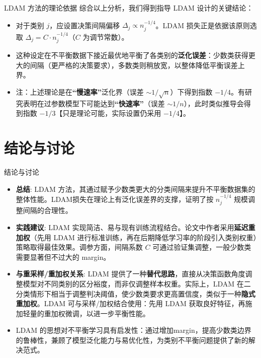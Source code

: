 \documentclass{beamer}
\begin{document}
\begin{frame}{LDAM 方法的理论依据}
    综合以上分析，我们得到指导 LDAM 设计的关键结论：
    \begin{itemize}
        \item 对于类别 $j$，应设置决策间隔偏移 $\Delta_j \propto n_j^{-1/4}$。LDAM 损失正是依据该原则选取 $\Delta_j = C \cdot n_j^{-1/4}$（$C$ 为调节常数）。
        \item 这种设定在不平衡数据下接近最优地平衡了各类别的\textbf{泛化误差}：少数类获得更大的间隔（更严格的决策要求），多数类则稍放宽，以整体降低平衡误差上界。
        \item 注：上述理论是在\textbf{“慢速率”}泛化界（误差 $\sim 1/\sqrt{n}$）下得到指数 $-1/4$。有研究表明在过参数模型下可能达到\textbf{“快速率”}（误差 $\sim 1/n$），此时类似推导会得到指数 $-1/3$【只是理论可能，实际设置仍采用 $-1/4$】。
    \end{itemize}
\end{frame}

\section{结论与讨论}
\begin{frame}{结论与讨论}
    \begin{itemize}
        \item \textbf{总结}: LDAM 方法，其通过赋予少数类更大的分类间隔来提升不平衡数据集的整体性能。LDAM损失在理论上有泛化误差界的支撑，证明了按 $n_j^{-1/4}$ 规模调整间隔的合理性。
        \item \textbf{实践建议}: LDAM 实现简洁、易与现有训练流程结合。论文中作者采用\textbf{延迟重加权}（先用 LDAM 进行标准训练，再在后期降低学习率的阶段引入类别权重）策略取得最佳效果。调参方面，间隔系数 $C$ 可通过验证集调整，一般少数类需要显著但不过大的 margin。
        \item \textbf{与重采样/重加权关系}: LDAM 提供了一种\textbf{替代思路}，直接从决策函数角度调整模型对不同类别的区分裕度，而非仅调整样本权重。实际上，LDAM 在二分类情形下相当于调整判决阈值，使少数类要求更高置信度，类似于一种\textbf{隐式重加权}。LDAM 可与采样/加权结合使用：先用 LDAM 获取良好特征，再施加轻量的重加权微调，以进一步平衡性能。
        \item LDAM 的思想对不平衡学习具有启发性：通过增加margin，提高少数类边界的鲁棒性，兼顾了模型泛化能力与易优化性，为类别不平衡问题提供了新的解决范式。
    \end{itemize}
\end{frame}
\end{document}
